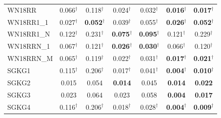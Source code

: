 \begin{table}[t]
{\begin{tabular}{l||cc||cc||cc}
\hline
WN18RR & 0.066$^\dagger$ & 0.118$^\dagger$ & 0.024$^\dagger$ & 0.032$^\dagger$ & \textbf{0.016}$^\dagger$ & \textbf{0.017}$^\dagger$ \\
WN18RR1\_1 & 0.027$^\dagger$ & \textbf{0.052}$^\dagger$ & 0.039$^\dagger$ & 0.055$^\dagger$ & \textbf{0.026}$^\dagger$ & \textbf{0.052}$^\dagger$ \\
WN18RR1\_N & 0.122$^\dagger$ & 0.231$^\dagger$ & \textbf{0.075}$^\dagger$ & \textbf{0.095}$^\dagger$ & 0.121$^\dagger$ & 0.229$^\dagger$ \\
WN18RRN\_1 & 0.067$^\dagger$ & 0.121$^\dagger$ & \textbf{0.026}$^\dagger$ & \textbf{0.030}$^\dagger$ & 0.066$^\dagger$ & 0.120$^\dagger$ \\
WN18RRN\_M & 0.065$^\dagger$ & 0.119$^\dagger$ & 0.022$^\dagger$ & 0.031$^\dagger$ & \textbf{0.017}$^\dagger$ & \textbf{0.021}$^\dagger$ \\
\hline
SGKG1 & 0.115$^\dagger$ & 0.206$^\dagger$ & 0.017$^\dagger$ & 0.041$^\dagger$ & \textbf{0.004}$^\dagger$ & \textbf{0.010}$^\dagger$ \\
SGKG2 & 0.015 & 0.054 & \textbf{0.014} & 0.045 & \textbf{0.014} & \textbf{0.022} \\
SGKG3 & 0.023 & 0.064 & 0.023 & 0.058 & \textbf{0.004} & \textbf{0.017} \\
SGKG4 & 0.116$^\dagger$ & 0.206$^\dagger$ & 0.018$^\dagger$ & 0.028$^\dagger$ & \textbf{0.004}$^\dagger$ & \textbf{0.009}$^\dagger$ \\
\hline
\end{tabular}%
}
\end{table}
